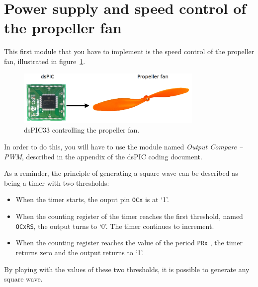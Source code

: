 \documentclass[11pt,a4paper]{article}
\theoremstyle{definition}%
\begin{document}


\section{Power supply and speed control of the propeller fan}
This first module that you have to implement is the speed control of the propeller fan, illustrated in figure~\ref{fig:helice}.

\begin{figure}[H]
\center
\includegraphics[width=0.8\textwidth]{alim-helice}
\caption{dsPIC33 controlling the propeller fan.}
\label{fig:helice}
\end{figure}

In order to do this, you will have to use the module named \textit{Output Compare -- PWM}, described in the appendix of the dsPIC coding document.

As a reminder, the principle of generating a square wave can be described as being a timer with two thresholds:
\begin{itemize}
	\item When the timer starts, the ouput pin \texttt{OCx} is at ‘1’.
	\item When the counting register of the timer reaches the first threshold, named \texttt{OCxRS}, the output turns to ‘0’.
	The timer continues to increment.
	\item When the counting register reaches the value of the period \texttt{PRx} , the timer returns zero and the output returns to ‘1’.
\end{itemize}

By playing with the values of these two thresholds, it is possible to generate any square wave.
\end{document}
